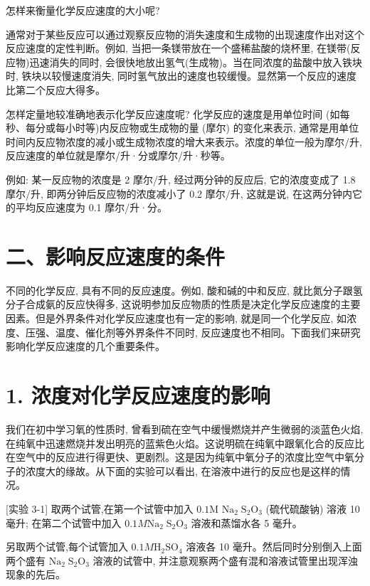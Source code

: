 \documentclass[10pt]{article}
\begin{document}
怎样来衡量化学反应速度的大小呢?

通常对于某些反应可以通过观察反应物的消失速度和生成物的出现速度作出对这个反应速度的定性判断。例如, 当把一条镁带放在一个盛稀盐酸的烧杯里, 在镁带(反应物)迅速消失的同时, 会很快地放出氢气(生成物)。当在同浓度的盐酸中放入铁块时, 铁块以较慢速度消失, 同时氢气放出的速度也较缓慢。显然第一个反应的速度比第二个反应大得多。

怎样定量地较准确地表示化学反应速度呢? 化学反应的速度是用单位时间 (如每秒、每分或每小时等)内反应物或生成物的量 (摩尔) 的变化来表示, 通常是用单位时间内反应物浓度的减小或生成物浓度的增大来表示。浓度的单位一般为摩尔/升, 反应速度的单位就是摩尔/升·分或摩尔/升·秒等。

例如: 某一反应物的浓度是 2 摩尔/升, 经过两分钟的反应后, 它的浓度变成了 1.8 摩尔/升, 即两分钟后反应物的浓度减小了 0.2 摩尔/升, 这就是说, 在这两分钟内它的平均反应速度为 0.1 摩尔/升·分。

\section*{二、影响反应速度的条件}

不同的化学反应, 具有不同的反应速度。例如, 酸和碱的中和反应, 就比氮分子跟氢分子合成氨的反应快得多, 这说明参加反应物质的性质是决定化学反应速度的主要因素。但是外界条件对化学反应速度也有一定的影响, 就是同一个化学反应, 如浓度、压强、温度、催化剂等外界条件不同时, 反应速度也不相同。下面我们来研究影响化学反应速度的几个重要条件。

\section*{1. 浓度对化学反应速度的影响}

我们在初中学习氧的性质时, 曾看到硫在空气中缓慢燃烧并产生微弱的淡蓝色火焰, 在纯氧中迅速燃烧并发出明亮的蓝紫色火焰。这说明硫在纯氧中跟氧化合的反应比在空气中的反应进行得更快、更剧烈。这是因为纯氧中氧分子的浓度比空气中氧分子的浓度大的缘故。从下面的实验可以看出, 在溶液中进行的反应也是这样的情况。

[实验 3-1] 取两个试管,在第一个试管中加入 \({0.1}\mathrm{M}\) \({\mathrm{{Na}}}_{2}{\mathrm{\;S}}_{2}{\mathrm{O}}_{3}\) (硫代硫酸钠) 溶液 10 毫升; 在第二个试管中加入 \({0.1M}{\mathrm{{Na}}}_{2}{\mathrm{\;S}}_{2}{\mathrm{O}}_{3}\) 溶液和蒸馏水各 5 毫升。

另取两个试管,每个试管加入 \({0.1M}{\mathrm{H}}_{2}{\mathrm{{SO}}}_{4}\) 溶液各 10 毫升。然后同时分别倒入上面两个盛有 \({\mathrm{{Na}}}_{2}{\mathrm{\;S}}_{2}{\mathrm{O}}_{3}\) 溶液的试管中, 并注意观察两个盛有混和溶液试管里出现浑浊现象的先后。
\end{document}
